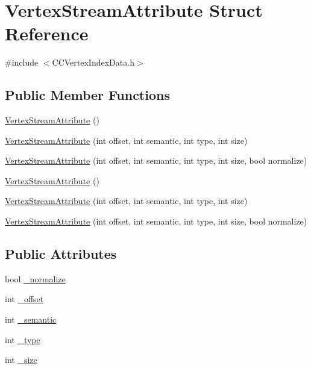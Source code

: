 \hypertarget{structVertexStreamAttribute}{}\section{Vertex\+Stream\+Attribute Struct Reference}
\label{structVertexStreamAttribute}


{\ttfamily \#include $<$C\+C\+Vertex\+Index\+Data.\+h$>$}

\subsection*{Public Member Functions}
\begin{DoxyCompactItemize}
\item 
\hyperlink{structVertexStreamAttribute_a37721a26567e79bdea1c2f9f0f33c663}{Vertex\+Stream\+Attribute} ()
\item 
\hyperlink{structVertexStreamAttribute_a563072570593c77863c79af39f198bc3}{Vertex\+Stream\+Attribute} (int offset, int semantic, int type, int size)
\item 
\hyperlink{structVertexStreamAttribute_adc59ee692bd5e28653556b0ff0380f75}{Vertex\+Stream\+Attribute} (int offset, int semantic, int type, int size, bool normalize)
\item 
\hyperlink{structVertexStreamAttribute_a37721a26567e79bdea1c2f9f0f33c663}{Vertex\+Stream\+Attribute} ()
\item 
\hyperlink{structVertexStreamAttribute_a563072570593c77863c79af39f198bc3}{Vertex\+Stream\+Attribute} (int offset, int semantic, int type, int size)
\item 
\hyperlink{structVertexStreamAttribute_adc59ee692bd5e28653556b0ff0380f75}{Vertex\+Stream\+Attribute} (int offset, int semantic, int type, int size, bool normalize)
\end{DoxyCompactItemize}
\subsection*{Public Attributes}
\begin{DoxyCompactItemize}
\item 
bool \hyperlink{structVertexStreamAttribute_aae71b3db2111f68a763991933ed81a25}{\+\_\+normalize}
\item 
int \hyperlink{structVertexStreamAttribute_a604664cdab2ba74074fe23dde99f1dea}{\+\_\+offset}
\item 
int \hyperlink{structVertexStreamAttribute_a4a739b976ccc06e68a3c663168a37b1d}{\+\_\+semantic}
\item 
int \hyperlink{structVertexStreamAttribute_a3a1c3011d9fe0c45c43655e0d98bc908}{\+\_\+type}
\item 
int \hyperlink{structVertexStreamAttribute_a033117a0981be4443bc7652f90e3c3a0}{\+\_\+size}
\end{DoxyCompactItemize}


